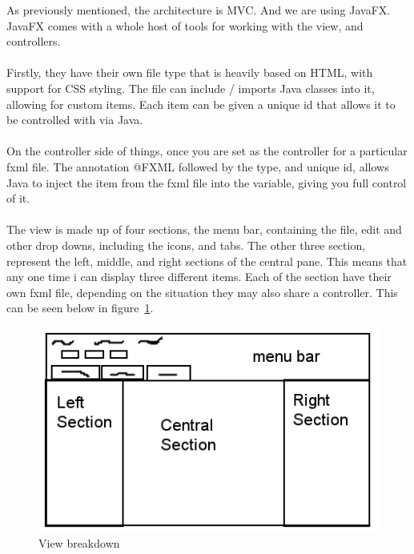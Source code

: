 As previously mentioned, the architecture is MVC. And we are using JavaFX. JavaFX comes with a whole host of tools for working with the view, and controllers. 
\\\\
Firstly, they have their own file type that is heavily based on HTML, with support for CSS styling. The file can include / imports Java classes into it, allowing for custom items. Each item can be given a unique id that allows it to be controlled with via Java.
\\\\
On the controller side of things, once you are set as the controller for a particular fxml file. The annotation @FXML followed by the type, and unique id, allows Java to inject the item from the fxml file into the variable, giving you full control of it.  
\\\\
The view is made up of four sections, the menu bar, containing the file, edit and other drop downs, including the icons, and tabs. The other three section, represent the left, middle, and right sections of the central pane. This means that any one time i can display three different items. Each of the section have their own fxml file, depending on the situation they may also share a controller. This can be seen below in figure~\ref{fig:view_breakdown}.

\begin{figure}[H]
	\centering
	\includegraphics[scale=0.5]{images/view_breakdown.png}
	\caption{View breakdown}
	\label{fig:view_breakdown}
\end{figure}

